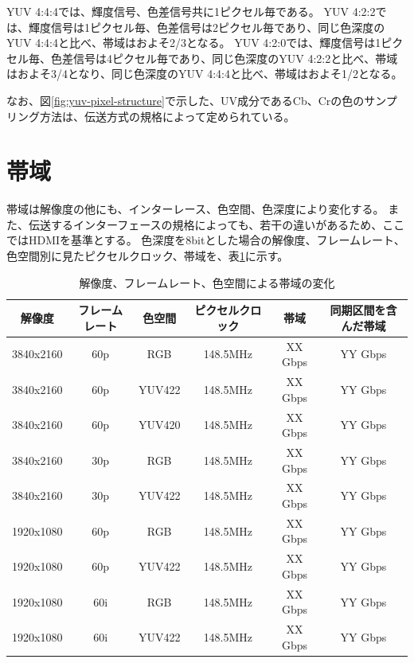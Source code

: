 YUV 4:4:4では、輝度信号、色差信号共に1ピクセル毎である。
YUV 4:2:2では、輝度信号は1ピクセル毎、色差信号は2ピクセル毎であり、同じ色深度のYUV 4:4:4と比べ、帯域はおよそ2/3となる。
YUV 4:2:0では、輝度信号は1ピクセル毎、色差信号は4ピクセル毎であり、同じ色深度のYUV 4:2:2と比べ、帯域はおよそ3/4となり、同じ色深度のYUV 4:4:4と比べ、帯域はおよそ1/2となる。

なお、図\ref{fig:yuv-pixel-structure}で示した、UV成分であるCb、Crの色のサンプリング方法は、伝送方式の規格によって定められている。

\section{帯域}
\label{sec:bandwidth}

帯域は解像度の他にも、インターレース、色空間、色深度により変化する。
また、伝送するインターフェースの規格によっても、若干の違いがあるため、ここではHDMIを基準とする。
色深度を8bitとした場合の解像度、フレームレート、色空間別に見たピクセルクロック、帯域を、表\ref{tb:video-bandwidth}に示す。


\begin{table}[htbp]
  \caption{解像度、フレームレート、色空間による帯域の変化}
  \label{tb:video-bandwidth}
  \begin{center}
  \begin{tabular}{c|c|c|c|c|c}
    \hline
    解像度     & フレームレート & 色空間  & ピクセルクロック & 帯域     & 同期区間を含んだ帯域 \\\hline\hline
    3840x2160 & 60p          & RGB    & 148.5MHz      & XX Gbps & YY Gbps           \\\hline
    3840x2160 & 60p          & YUV422 & 148.5MHz      & XX Gbps & YY Gbps           \\\hline
    3840x2160 & 60p          & YUV420 & 148.5MHz      & XX Gbps & YY Gbps           \\\hline
    3840x2160 & 30p          & RGB    & 148.5MHz      & XX Gbps & YY Gbps           \\\hline
    3840x2160 & 30p          & YUV422 & 148.5MHz      & XX Gbps & YY Gbps           \\\hline
    1920x1080 & 60p          & RGB    & 148.5MHz      & XX Gbps & YY Gbps           \\\hline
    1920x1080 & 60p          & YUV422 & 148.5MHz      & XX Gbps & YY Gbps           \\\hline
    1920x1080 & 60i          & RGB    & 148.5MHz      & XX Gbps & YY Gbps           \\\hline
    1920x1080 & 60i          & YUV422 & 148.5MHz      & XX Gbps & YY Gbps           \\\hline
  \end{tabular}\end{center}
\end{table}

